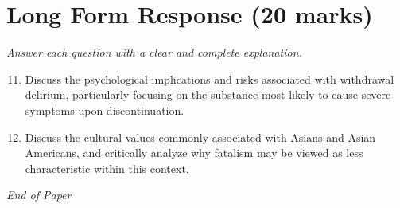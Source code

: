 \documentclass[12pt]{article}
\begin{document}
\section*{Long Form Response (20 marks)}
\textit{Answer each question with a clear and complete explanation.}
\begin{enumerate}[label=\arabic*.]
\setcounter{enumi}{10}
\item Discuss the psychological implications and risks associated with withdrawal delirium, particularly focusing on the substance most likely to cause severe symptoms upon discontinuation.
\item Discuss the cultural values commonly associated with Asians and Asian Americans, and critically analyze why fatalism may be viewed as less characteristic within this context.
\end{enumerate}

\vfill
\noindent\textit{End of Paper}
\end{document}
